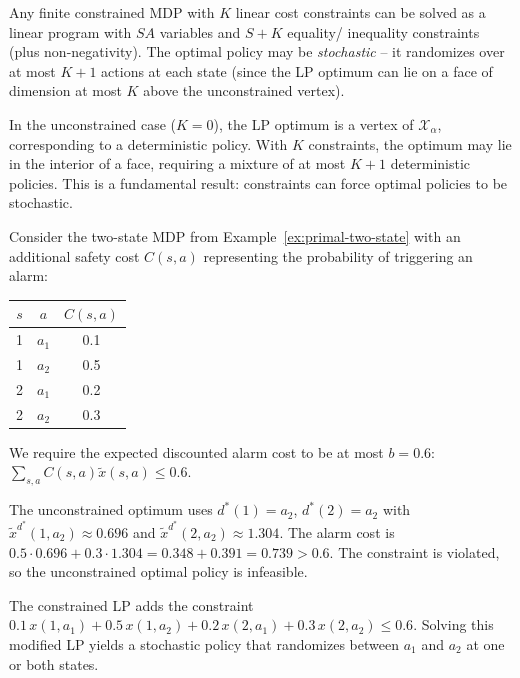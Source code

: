 \documentclass[11pt,a4paper]{article}
\begin{document}
\begin{keyresult}[title={Constrained MDPs via Linear Programming}]
\label{kr:cmdp}
Any finite constrained MDP with $K$ linear cost constraints can be
solved as a linear program with $SA$ variables and $S + K$ equality/
inequality constraints (plus non-negativity). The optimal policy may
be \emph{stochastic} -- it randomizes over at most $K + 1$ actions
at each state (since the LP optimum can lie on a face of dimension
at most $K$ above the unconstrained vertex).
\end{keyresult}

\begin{remark}
\label{rem:randomization}
In the unconstrained case ($K = 0$), the LP optimum is a vertex
of $\mathcal{X}_\alpha$, corresponding to a deterministic policy.
With $K$ constraints, the optimum may lie in the interior of a
face, requiring a mixture of at most $K + 1$ deterministic policies.
This is a fundamental result: constraints can force optimal policies
to be stochastic.
\end{remark}

\begin{example}
\label{ex:cmdp}
Consider the two-state MDP from Example~\ref{ex:primal-two-state}
with an additional safety cost $C(s,a)$ representing the probability
of triggering an alarm:
\begin{center}
\begin{tabular}{ccc}
\toprule
$s$ & $a$ & $C(s,a)$ \\
\midrule
1 & $a_1$ & 0.1 \\
1 & $a_2$ & 0.5 \\
2 & $a_1$ & 0.2 \\
2 & $a_2$ & 0.3 \\
\bottomrule
\end{tabular}
\end{center}
We require the expected discounted alarm cost to be at most $b = 0.6$:
$\sum_{s,a} C(s,a) \tilde{x}(s,a) \leq 0.6$.

The unconstrained optimum uses $d^*(1) = a_2$, $d^*(2) = a_2$ with
$\tilde{x}^{d^*}(1, a_2) \approx 0.696$ and
$\tilde{x}^{d^*}(2, a_2) \approx 1.304$. The alarm cost is
$0.5 \cdot 0.696 + 0.3 \cdot 1.304 = 0.348 + 0.391 = 0.739 > 0.6$.
The constraint is violated, so the unconstrained optimal policy is
infeasible.

The constrained LP adds the constraint
$0.1\, x(1,a_1) + 0.5\, x(1,a_2) + 0.2\, x(2,a_1) +
0.3\, x(2,a_2) \leq 0.6$. Solving this modified LP yields a
stochastic policy that randomizes between $a_1$ and $a_2$ at
one or both states.
\end{example}
\end{document}
